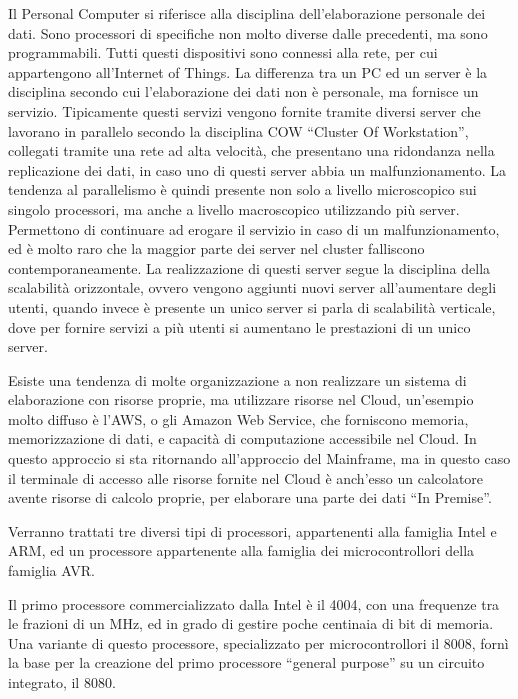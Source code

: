 \documentclass{article}
\numberwithin{equation}{subsection}
\begin{document}
Il Personal Computer si riferisce alla disciplina dell'elaborazione personale dei dati. Sono processori di specifiche non molto diverse dalle precedenti, ma sono 
programmabili. Tutti questi dispositivi sono connessi alla rete, per cui appartengono all'Internet of Things. La differenza tra un PC ed un server è la disciplina secondo cui 
l'elaborazione dei dati non è personale, ma fornisce un servizio. Tipicamente questi servizi vengono fornite tramite diversi server che lavorano in parallelo secondo la 
disciplina COW ``Cluster Of Workstation'', collegati 
tramite una rete ad alta velocità, che presentano una ridondanza nella replicazione dei dati, in caso uno di questi server abbia un malfunzionamento. La tendenza al parallelismo 
è quindi presente non solo a livello microscopico sui singolo processori, ma anche a livello macroscopico utilizzando più server. Permettono di continuare ad erogare il servizio in 
caso di un malfunzionamento, ed è molto raro che la maggior parte dei server nel cluster falliscono contemporaneamente. La realizzazione di questi server segue la disciplina 
della scalabilità orizzontale, ovvero vengono aggiunti nuovi server all'aumentare degli utenti, quando invece è presente un unico server si parla di scalabilità verticale, dove 
per fornire servizi a più utenti si aumentano le prestazioni di un unico server. 


Esiste una tendenza di molte organizzazione a non realizzare un sistema di elaborazione con risorse proprie, ma utilizzare risorse nel Cloud, un'esempio molto diffuso è l'AWS, 
o gli Amazon Web Service, che forniscono memoria, memorizzazione di dati, e capacità di computazione accessibile nel Cloud. In questo approccio si sta ritornando all'approccio 
del Mainframe, ma in questo caso il terminale di accesso alle risorse fornite nel Cloud è anch'esso un calcolatore avente risorse di calcolo proprie, per elaborare una 
parte dei dati ``In Premise''. 



Verranno trattati tre diversi tipi di processori, appartenenti alla famiglia Intel e ARM, ed un processore appartenente alla famiglia dei microcontrollori della famiglia AVR.

Il primo processore commercializzato dalla Intel è il 4004, con una frequenze tra le frazioni di un MHz, ed in grado di gestire poche centinaia di bit di memoria. Una variante 
di questo processore, specializzato per microcontrollori il 8008, fornì la base per la creazione del primo processore ``general purpose'' su un circuito integrato, il 8080.  
\end{document}
